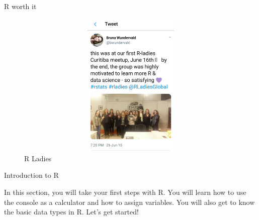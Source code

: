 \documentclass[
  ignorenonframetext,
]{beamer}
\begin{document}
\begin{frame}{R worth it}
\protect\hypertarget{r-worth-it}{}

\begin{figure}
\centering
\includegraphics[width = 18cm, height = 7cm]{Images/r_ladies.JPG}
\caption{R Ladies}
\end{figure}

\end{frame}

\begin{frame}{Introduction to R}
\protect\hypertarget{introduction-to-r}{}

In this section, you will take your first steps with R. You will learn
how to use the console as a calculator and how to assign variables. You
will also get to know the basic data types in R. Let's get started!

\end{frame}
\end{document}
